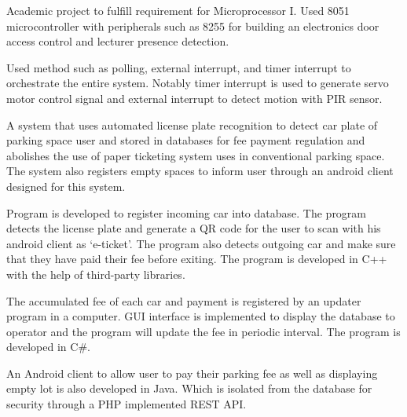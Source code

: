 \documentclass[letterpaper]{deedy-resume} %
\begin{document}
\begin{minipage}[t]{0.66\textwidth}
\vspace{\topsep}
\begin{tightitemize}
\item Academic project to fulfill requirement for Microprocessor I. 
Used 8051 microcontroller with peripherals such as 8255 for building an electronics door access control and lecturer presence detection.
\item Used method such as polling, external interrupt, and timer interrupt to orchestrate the entire system.
Notably timer interrupt is used to generate servo motor control signal and external interrupt to detect motion with PIR sensor.
\end{tightitemize} 
\sectionspace %

\vspace{\topsep}
\begin{tightitemize}
\item A system that uses automated license plate recognition to detect car plate of parking space user and stored
in databases for fee payment regulation and abolishes the use of paper ticketing system uses in conventional parking space. 
The system also registers empty spaces to inform user through an android client designed for this system.
\item Program is developed to register incoming car into database. 
The program detects the license plate and generate a QR code for the user to scan with his android client as ‘e-ticket’. 
The program also detects outgoing car and make sure that they have paid their fee before exiting. 
The program is developed in C++ with the help of third-party libraries.
\item The accumulated fee of each car and payment is registered by an updater program in a computer. 
GUI interface is implemented to display the database to operator and the program will update the fee in periodic interval. The program is developed in C\#.
\item An Android client to allow user to pay their parking fee as well as displaying empty lot is also developed in Java. 
Which is isolated from the database for security through a PHP implemented REST API.
\end{tightitemize} 
\sectionspace %

\end{minipage}
\end{document}

